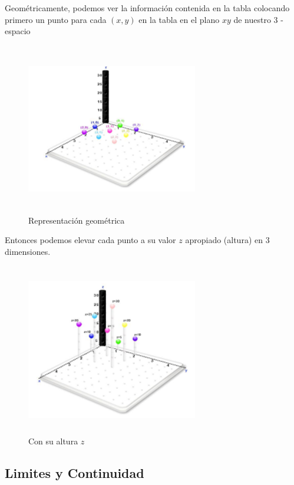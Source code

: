 Geométricamente, podemos ver la información contenida en la tabla colocando primero un punto para cada $(x, y)$ en la tabla en el plano $x y$ de nuestro 3 -espacio\par

\begin{figure}[H]
    \centering
    \includegraphics[width=7.5cm, height=7.5cm]{imagenes/NImagen2.png}
    \caption{Representación geométrica}
\end{figure}
\newpage
Entonces podemos elevar cada punto a su valor $z$ apropiado (altura) en 3 dimensiones.\par

\begin{figure}[H]
    \centering
    \includegraphics[width=7.5cm, height=7.5cm]{imagenes/Imagen3.png}
    \caption{Con su altura $z$}
\end{figure}

\subsection{Limites y Continuidad}

